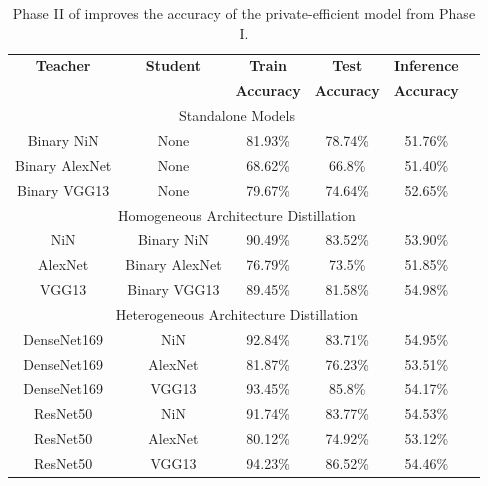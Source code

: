 \begin{table}[!htb]
\begin{center}
\renewcommand\arraystretch{1.5}
\fontsize{6.7pt}{6.7pt}\selectfont
\begin{tabular}{|c|c|c|c|c|c|}
\hline
\textbf{Teacher} & \textbf{Student} & \textbf{Train}  & \textbf{Test}  & \textbf{Inference}  \\
&  & \textbf{Accuracy} & \textbf{Accuracy} & \textbf{Accuracy}  \\
\hline
\multicolumn{5}{|c|}{Standalone Models}\\
\hline
Binary NiN & None & 81.93\% & 78.74\% & 51.76\% \\
Binary AlexNet & None & 68.62\% & 66.8\% & 51.40\% \\
Binary VGG13 & None & 79.67\% & 74.64\% & 52.65\%\\
\hline
\multicolumn{5}{|c|}{Homogeneous Architecture Distillation}\\
\hline
NiN & Binary NiN & 90.49\% & 83.52\% & 53.90\% \\
AlexNet & Binary AlexNet & 76.79\% & 73.5\% & 51.85\% \\
VGG13 & Binary VGG13 & 89.45\% & 81.58\% & 54.98\%\\
\hline
\multicolumn{5}{|c|}{Heterogeneous Architecture Distillation}\\
\hline
DenseNet169 & NiN & 92.84\% & 83.71\% & 54.95\%\\
DenseNet169 & AlexNet & 81.87\% & 76.23\% & 53.51\%\\
DenseNet169 & VGG13 & 93.45\% & 85.8\% & 54.17\%\\
\hline
ResNet50 & NiN & 91.74\% & 83.77\% & 54.53\% \\
ResNet50 & AlexNet & 80.12\% & 74.92\% & 53.12\%\\
ResNet50 & VGG13 & 94.23\% & 86.52\% & 54.46\%\\
\hline
\end{tabular}
\end{center}
\caption{Phase II of \method\hspace{0.02in} improves the accuracy of the private-efficient model from Phase I.}
\label{kd}
\vspace{-0.3in}
\end{table}


